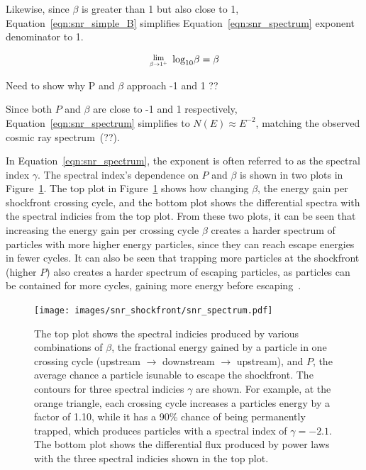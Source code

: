   Likewise, since $\beta$ is greater than 1 but also close to 1, Equation~\ref{eqn:snr_simple_B} simplifies Equation~\ref{eqn:snr_spectrum} exponent denominator to 1.

  \begin{equation}\label{eqn:snr_simple_B}
    \Lim{\beta \rightarrow 1^{+} } \; \textrm{log}_{10} \beta = \beta
  \end{equation}
  
  {\color{red} Need to show why P and $\beta$ approach -1 and 1 ??}
  
  Since both $P$ and $\beta$ are close to -1 and 1 respectively, Equation~\ref{eqn:snr_spectrum} simplifies to $N(E) \approx E^{-2}$, matching the observed cosmic ray spectrum~\cite{}{\color{red}(??)}.
  
  In Equation~\ref{eqn:snr_spectrum}, the exponent is often referred to as the spectral index $\gamma$.
  The spectral index's dependence on $P$ and $\beta$ is shown in two plots in Figure~\ref{fig:snr_spectrum}.
  The top plot in Figure~\ref{fig:snr_spectrum} shows how changing $\beta$, the energy gain per shockfront crossing cycle, and the bottom plot shows the differential spectra with the spectral indicies from the top plot.
  From these two plots, it can be seen that increasing the energy gain per crossing cycle $\beta$ creates a harder spectrum of particles with more higher energy particles, since they can reach escape energies in fewer cycles.
  It can also be seen that trapping more particles at the shockfront (higher $P$) also creates a harder spectrum of escaping particles, as particles can be contained for more cycles, gaining more energy before escaping~\cite{dsa6}.

  \begin{figure}[ht]
    \centering
    \texttt{[image: images/snr\_shockfront/snr\_spectrum.pdf]}
    \caption[Supernova Diffuse Acceleration Spectral Indicies]{
      The top plot shows the spectral indicies produced by various combinations of $\beta$, the fractional energy gained by a particle in one crossing cycle (upstream $\rightarrow$ downstream $\rightarrow$ upstream), and $P$, the average chance a particle isunable to escape the shockfront.
      The contours for three spectral indicies $\gamma$ are shown.
      For example, at the orange triangle, each crossing cycle increases a particles energy by a factor of 1.10, while it has a 90\% chance of being permanently trapped, which produces particles with a spectral index of $\gamma=-2.1$.
      The bottom plot shows the differential flux produced by power laws with the three spectral indicies shown in the top plot.
    }\label{fig:snr_spectrum}
  \end{figure}
  
